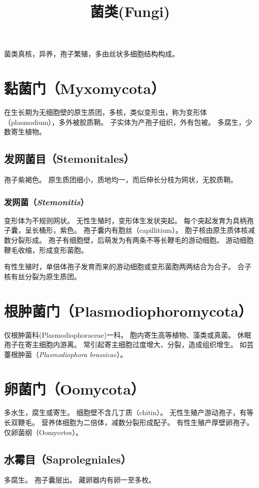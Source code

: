 \documentclass[11pt]{article}
\title{菌类(Fungi)}
\date{}
\begin{document}
  \maketitle

  \linenumbers
菌类真核，异养，孢子繁殖，多由丝状多细胞结构构成。

\section{黏菌门（Myxomycota）}
在生长期为无细胞壁的原生质团，多核，类似变形虫，称为变形体（plasmodium），多外被胶质鞘。
子实体为产孢子组织，外有包被。
多腐生，少数寄生植物。

\subsection{发网菌目（Stemonitales）}
孢子紫褐色。
原生质团细小，质地均一，而后伸长分枝为网状，无胶质鞘。


\subsubsection{发网菌（\textit{Stemonitis}）}
变形体为不规则网状。
无性生殖时，变形体生发状突起。
每个突起发育为具柄孢子囊，呈长桶形，紫色。
孢子囊内有胞丝（capillitium）。
胞子核由原生质体核减数分裂形成。
孢子有细胞壁，后萌发为有两条不等长鞭毛的游动细胞。
游动细胞鞭毛收缩，形成变形菌胞。

\newline

有性生殖时，单倍体孢子发育而来的游动细胞或变形菌胞两两结合为合子。
合子核有丝分裂为原生质团。

\section{根肿菌门（Plasmodiophoromycota）}
仅根肿菌科(Plasmodiophoraceae)一科。
胞内寄生高等植物、藻类或真菌。
休眠孢子在寄主细胞内游离。
常引起寄主细胞过度增大、分裂，造成组织增生。
如芸薹根肿菌（\textit{Plasmodiophora brassicae}）。

\section{卵菌门（Oomycota）}
多水生，腐生或寄生。
细胞壁不含几丁质（chitin）。
无性生殖产游动孢子，有等长双鞭毛。
营养体细胞为二倍体，减数分裂形成配子。
有性生殖产厚壁卵孢子。
仅卵菌纲（Oomycetes）。

\subsection{水霉目（Saprolegniales）}
多腐生。
孢子囊层出。
藏卵器内有卵一至多枚。
\end{document}
